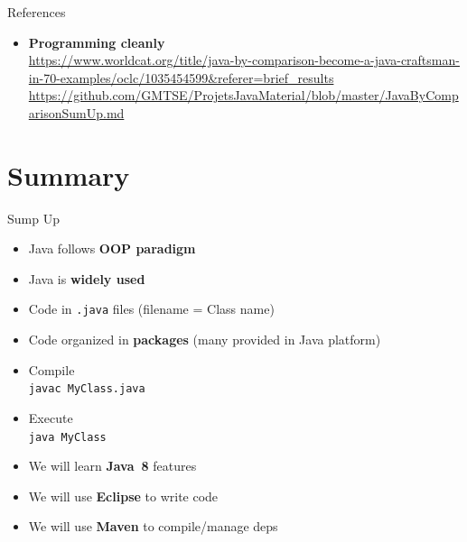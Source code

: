 \documentclass[English,c,%
hyperref={%
    pdftitle={FISA-DE2 OOP in Java},%
    pdfauthor={Muller, Gravier, Laforest, Subercaze},%
    pdfsubject={OOP in Java},%
    pdfkeywords={OOP, Java},%
    colorlinks=true,%
    urlcolor=blue,%
    linkcolor=%
    },%
xcolor={pdftex,svgnames} %
]{beamer}
\begin{document}
\begin{frame}{References}
{\begin{itemize}
  \item \textbf{Programming cleanly}\\
  \url{https://www.worldcat.org/title/java-by-comparison-become-a-java-craftsman-in-70-examples/oclc/1035454599&referer=brief_results} \\
  \url{https://github.com/GMTSE/ProjetsJavaMaterial/blob/master/JavaByComparisonSumUp.md}

\end{itemize}
}

\end{frame}



\section{Summary}
\begin{frame}{Sump Up}
  \begin{itemize}
    \item Java follows \textbf{OOP paradigm}
    \item Java is \textbf{widely used}
\medskip
    \item Code in \texttt{.java} files (filename = Class name)
    \item Code organized in \textbf{packages} (many provided in Java platform)
    \item Compile\\
    \texttt{javac MyClass.java}
    \item Execute\\
    \texttt{java MyClass}
\medskip
    \item We will learn \textbf{Java~8} features
    \item We will use \textbf{Eclipse} to write code
    \item We will use \textbf{Maven} to compile/manage deps
  \end{itemize}
\end{frame}
\end{document}
